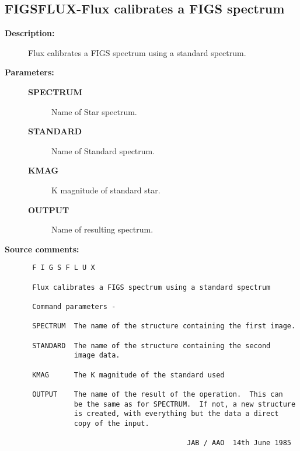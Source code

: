 \subsection{FIGSFLUX-\label{FIGSFLUX}Flux calibrates a FIGS spectrum}
\begin{description}

\item [{\bf Description:}]
 Flux calibrates a FIGS spectrum using a standard spectrum.

\item [{\bf Parameters:}]
\begin{description}
\item [{\bf SPECTRUM}]
 Name of Star spectrum.
\item [{\bf STANDARD}]
 Name of Standard spectrum.
\item [{\bf KMAG}]
 K magnitude of standard star.
\item [{\bf OUTPUT}]
 Name of resulting spectrum.
\end{description}

\item [{\bf Source comments:}]
\begin{verbatim}
 F I G S F L U X

 Flux calibrates a FIGS spectrum using a standard spectrum

 Command parameters -

 SPECTRUM  The name of the structure containing the first image.

 STANDARD  The name of the structure containing the second
           image data.

 KMAG      The K magnitude of the standard used

 OUTPUT    The name of the result of the operation.  This can
           be the same as for SPECTRUM.  If not, a new structure
           is created, with everything but the data a direct
           copy of the input.

                                      JAB / AAO  14th June 1985
\end{verbatim}
\end{description}
